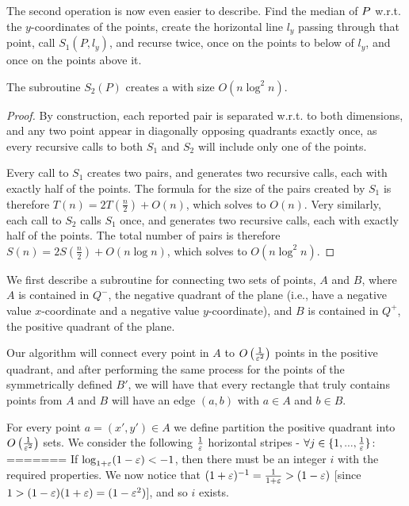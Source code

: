 \documentclass[12pt]{article}%
\begin{document}
The second operation is now even easier to describe. Find the median
of $P$ w.r.t. the $y$-coordinates of the points, create the
horizontal line $l_y$ passing through that point, call $S_1(P,l_y)$,
and recurse twice, once on the points to below of $l_y$, and once on
the points above it.

\begin{claim}
    The subroutine $S_2(P)$ creates a \QSPD with size $O(n\log^2n)$.
\end{claim}

\begin{proof}
    By construction, each reported pair is separated w.r.t. to both
    dimensions, and any two point appear in diagonally opposing
    quadrants exactly once, as every recursive calls to both $S_1$ and
    $S_2$ will include only one of the points.
    
    Every call to $S_1$ creates two pairs, and generates two recursive
    calls, each with exactly half of the points. The formula for the
    size of the pairs created by $S_1$ is therefore
    $T(n)=2T\left( \frac{n}{2}\right) + O(n)$, which solves to
    $O(n)$. Very similarly, each call to $S_2$ calls $S_1$ once, and
    generates two recursive calls, each with exactly half of the
    points. The total number of pairs is therefore
    $S(n)=2S\left( \frac{n}{2}\right) + O(n\log n)$, which solves to
    $O(n\log^2n)$.
    
\end{proof}






We first describe a subroutine for connecting two sets of points, $A$
and $B$, where $A$ is contained in $Q^-$, the negative quadrant of the
plane (i.e., have a negative value $x$-coordinate and a negative value
$y$-coordinate), and $B$ is contained in $Q^+$, the positive quadrant
of the plane.

Our algorithm will connect every point in $A$ to
$O\left(\frac{1}{\varepsilon^2}\right)$ points in the positive quadrant, and
after performing the same process for the points of the symmetrically
defined $B'$, we will have that every rectangle that truly contains
points from $A$ and $B$ will have an edge $(a,b)$ with $a\in A$ and
$b\in B$.

For every point $a = (x',y') \in A$ we define partition the positive
quadrant into $O\left(\frac{1}{\varepsilon^2}\right)$ sets. We consider the
following $\frac{1}{\varepsilon}$ horizontal stripes -
$\forall j\in \{1,...,\frac{1}{\varepsilon}\}$:
=======
If $\log_{1+\varepsilon}(1-\varepsilon)<-1$, then there must be an integer $i$ with the required properties. We now notice that $(1+\varepsilon)^{-1}=\frac{1}{1+\varepsilon}>(1-\varepsilon)$ [since $1>(1-\varepsilon)(1+\varepsilon)=(1-\varepsilon^2)$], and so $i$ exists.
\end{document}
